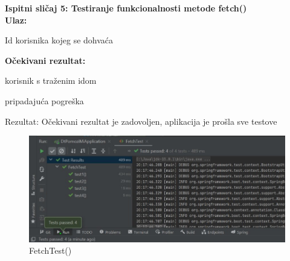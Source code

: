             \noindent \textbf{Ispitni sličaj 5: Testiranje funkcionalnosti metode fetch()}\\
			
			\medskip
            \noindent\textbf{Ulaz:}
            \begin{packed_enum}
            \item Id korisnika kojeg se dohvaća
            \end{packed_enum}
            
            \noindent\textbf{Očekivani rezultat:}
            \begin{packed_enum}
            \item korisnik s traženim idom
            \item pripadajuća pogreška
            \end{packed_enum}
            
            \noindent \text
            Rezultat: Očekivani rezultat je zadovoljen, aplikacija je prošla sve testove \\
            
            \begin{figure}[H]
                 \includegraphics[width=\textwidth, height=\textheight, keepaspectratio]{slike/FetchTest.jpeg}
                \centering
                \caption{FetchTest()}
            \end{figure}
            
